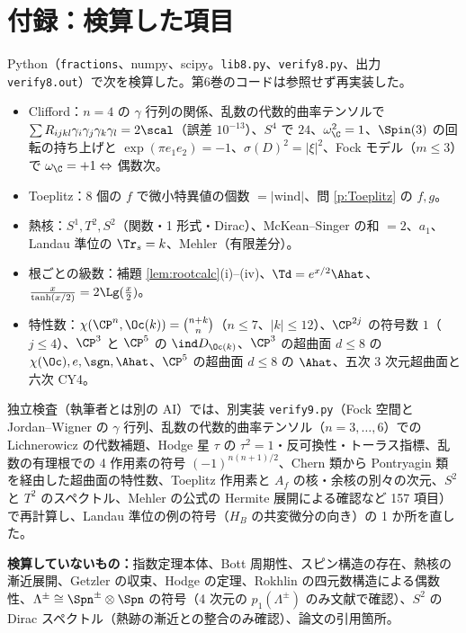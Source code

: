 \section*{付録：検算した項目}
Python（\texttt{fractions}、numpy、scipy。\texttt{lib8.py}、\texttt{verify8.py}、出力 \texttt{verify8.out}）で次を検算した。第6巻のコードは参照せず再実装した。
\begin{itemize}
\item Clifford：$n=4$ の $\gamma$ 行列の関係、乱数の代数的曲率テンソルで $\sum R_{ijkl}\gamma_i\gamma_j\gamma_k\gamma_l=2\scal$（誤差 $10^{-13}$）、$S^4$ で $24$、$\omega_{\C}^2=1$、$\Spin(3)$ の回転の持ち上げと $\exp(\pi e_1e_2)=-1$、$\sigma(D)^2=|\xi|^2$、Fock モデル（$m\le3$）で $\omega_{\C}=+1\Leftrightarrow$ 偶数次。
\item Toeplitz：8 個の $f$ で微小特異値の個数 $=|\mathrm{wind}|$、問 \ref{p:Toeplitz} の $f,g$。
\item 熱核：$S^1,T^2,S^2$（関数・1 形式・Dirac）、McKean--Singer の和 $=2$、$a_1$、Landau 準位の $\Tr_s=k$、Mehler（有限差分）。
\item 根ごとの級数：補題 \ref{lem:rootcalc}(i)--(iv)、$\Td=e^{x/2}\Ahat$、$\frac x{\tanh(x/2)}=2\Lg(\frac x2)$。
\item 特性数：$\chi(\CP^n,\Oc(k))=\binom{n+k}n$（$n\le7$、$|k|\le12$）、$\CP^{2j}$ の符号数 $1$（$j\le4$）、$\CP^3$ と $\CP^5$ の $\ind D_{\Oc(k)}$、$\CP^3$ の超曲面 $d\le8$ の $\chi(\Oc),e,\sgn,\Ahat$、$\CP^5$ の超曲面 $d\le8$ の $\Ahat$、五次 3 次元超曲面と六次 CY4。
\end{itemize}
独立検査（執筆者とは別の AI）では、別実装 \texttt{verify9.py}（Fock 空間と Jordan--Wigner の $\gamma$ 行列、乱数の代数的曲率テンソル（$n=3,\dots,6$）での Lichnerowicz の代数補題、Hodge 星 $\tau$ の $\tau^2=1$・反可換性・トーラス指標、乱数の有理根での 4 作用素の符号 $(-1)^{n(n+1)/2}$、Chern 類から Pontryagin 類を経由した超曲面の特性数、Toeplitz 作用素と $A_f$ の核・余核の別々の次元、$S^2$ と $T^2$ のスペクトル、Mehler の公式の Hermite 展開による確認など 157 項目）で再計算し、Landau 準位の例の符号（$H_B$ の共変微分の向き）の 1 か所を直した。\par\medskip\noindent\textbf{検算していないもの：}指数定理本体、Bott 周期性、スピン構造の存在、熱核の漸近展開、Getzler の収束、Hodge の定理、Rokhlin の四元数構造による偶数性、$\Lambda^\pm\cong\Spn^\pm\otimes\Spn$ の符号（4 次元の $p_1(\Lambda^\pm)$ のみ文献で確認）、$S^2$ の Dirac スペクトル（熱跡の漸近との整合のみ確認）、論文の引用箇所。

